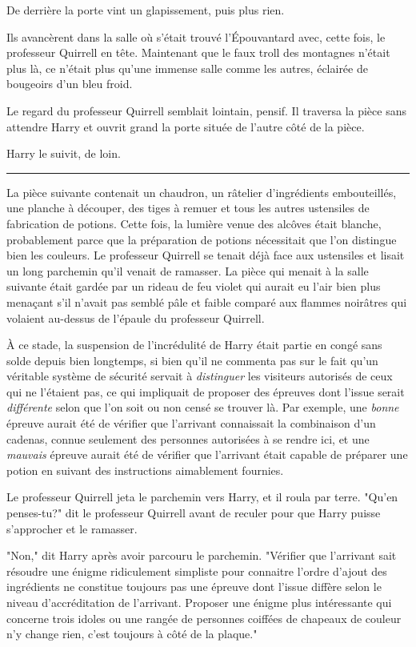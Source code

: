 De derrière la porte vint un glapissement, puis plus rien.

Ils avancèrent dans la salle où s'était trouvé l'Épouvantard avec, cette fois, le professeur Quirrell en tête. Maintenant que le faux troll des montagnes n'était plus là, ce n'était plus qu'une immense salle comme les autres, éclairée de bougeoirs d'un bleu froid.

Le regard du professeur Quirrell semblait lointain, pensif. Il traversa la pièce sans attendre Harry et ouvrit grand la porte située de l'autre côté de la pièce.

Harry le suivit, de loin.
\par\noindent\rule{\textwidth}{0.4pt}
La pièce suivante contenait un chaudron, un râtelier d'ingrédients embouteillés, une planche à découper, des tiges à remuer et tous les autres ustensiles de fabrication de potions. Cette fois, la lumière venue des alcôves était blanche, probablement parce que la préparation de potions nécessitait que l'on distingue bien les couleurs. Le professeur Quirrell se tenait déjà face aux ustensiles et lisait un long parchemin qu'il venait de ramasser. La pièce qui menait à la salle suivante était gardée par un rideau de feu violet qui aurait eu l'air bien plus menaçant s'il n'avait pas semblé pâle et faible comparé aux flammes noirâtres qui volaient au-dessus de l'épaule du professeur Quirrell.

À ce stade, la suspension de l'incrédulité de Harry était partie en congé sans solde depuis bien longtemps, si bien qu'il ne commenta pas sur le fait qu'un véritable système de sécurité servait à \emph{distinguer}  les visiteurs autorisés de ceux qui ne l'étaient pas, ce qui impliquait de proposer des épreuves dont l'issue serait \emph{différente}  selon que l'on soit ou non censé se trouver là. Par exemple, une \emph{bonne}  épreuve aurait été de vérifier que l'arrivant connaissait la combinaison d'un cadenas, connue seulement des personnes autorisées à se rendre ici, et une \emph{mauvais}  épreuve aurait été de vérifier que l'arrivant était capable de préparer une potion en suivant des instructions aimablement fournies.

Le professeur Quirrell jeta le parchemin vers Harry, et il roula par terre. "Qu'en penses-tu?" dit le professeur Quirrell avant de reculer pour que Harry puisse s'approcher et le ramasser.

"Non," dit Harry après avoir parcouru le parchemin. "Vérifier que l'arrivant sait résoudre une énigme ridiculement simpliste pour connaitre l'ordre d'ajout des ingrédients ne constitue toujours pas une épreuve dont l'issue diffère selon le niveau d'accréditation de l'arrivant. Proposer une énigme plus intéressante qui concerne trois idoles ou une rangée de personnes coiffées de chapeaux de couleur n'y change rien, c'est toujours à côté de la plaque."

